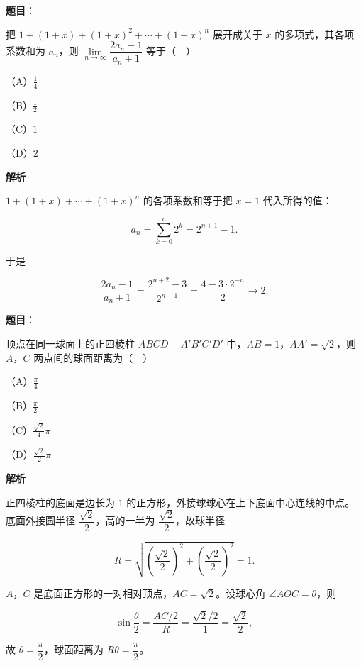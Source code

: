 \begin{answer}

\textbf{题目}：

把 $1+(1+x)+(1+x)^2+\cdots+(1+x)^n$ 展开成关于 $x$ 的多项式，其各项系数和为 $a_n$，则 $\lim\limits_{n\to\infty}\dfrac{2a_n-1}{a_n+1}$ 等于（　）

（A）$\frac14$

（B）$\frac12$

（C）$1$

（D）$2$

\textbf{解析}

$1+(1+x)+\cdots+(1+x)^n$ 的各项系数和等于把 $x=1$ 代入所得的值：

\nopagebreak[4]
\[a_n=\sum_{k=0}^n2^k=2^{n+1}-1.\]

于是

\nopagebreak[4]
\[\frac{2a_n-1}{a_n+1}=\frac{2^{n+2}-3}{2^{n+1}}=\frac{4-3\cdot2^{-n}}{2}\to2.\]


\end{answer}
\begin{answer}

\textbf{题目}：

顶点在同一球面上的正四棱柱 $ABCD-A'B'C'D'$ 中，$AB=1$，$AA'=\sqrt2$，则 $A$，$C$ 两点间的球面距离为（　）

（A）$\frac{\pi}4$

（B）$\frac{\pi}2$

（C）$\frac{\sqrt2}4\pi$

（D）$\frac{\sqrt2}2\pi$

\textbf{解析}

正四棱柱的底面是边长为 $1$ 的正方形，外接球球心在上下底面中心连线的中点。底面外接圆半径 $\dfrac{\sqrt2}2$，高的一半为 $\dfrac{\sqrt2}2$，故球半径

\nopagebreak[4]
\[R=\sqrt{\left(\frac{\sqrt2}2\right)^2+\left(\frac{\sqrt2}2\right)^2}=1.\]

$A$，$C$ 是底面正方形的一对相对顶点，$AC=\sqrt2$。设球心角 $\angle AOC=\theta$，则

\nopagebreak[4]
\[\sin\frac\theta2=\frac{AC/2}{R}=\frac{\sqrt2/2}1=\frac{\sqrt2}2,\]

故 $\theta=\dfrac{\pi}2$，球面距离为 $R\theta=\dfrac{\pi}2$。


\end{answer}
